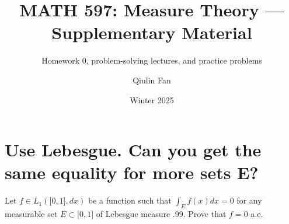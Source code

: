 \documentclass{qlnotes-export}
\title{MATH 597: Measure Theory --- Supplementary Material}
\subtitle{Homework 0, problem-solving lectures, and practice problems}
\author{Qiulin Fan}
\date{Winter 2025}
\begin{document}
\mainmatter
\chapter{Use Lebesgue. Can you get the same equality for more sets E?}

Let \(f \in L_{1}(\lbrack 0,1\rbrack,dx)\) be a function such that \(\int_{E}f(x)dx = 0\) for any measurable set \(E \subset \lbrack 0,1\rbrack\) of Lebesgue measure .99. Prove that \(f = 0\) a.e.
\end{document}
